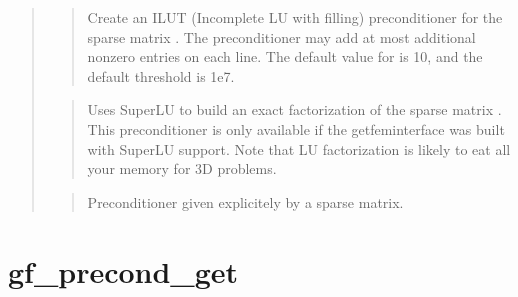 \documentclass[a4paper,11pt,english]{sphinxmanual}
\begin{document}
\begin{quote}
\sphinxAtStartPar
{}
\begin{quote}

\sphinxAtStartPar
Create an ILUT (Incomplete LU with filling) preconditioner for the
sparse matrix . The preconditioner may add at most 
additional non\sphinxhyphen{}zero entries on each line. The default value for
 is 10, and the default threshold is 1e\sphinxhyphen{}7.
\end{quote}

\sphinxAtStartPar
{}
\begin{quote}

\sphinxAtStartPar
Uses SuperLU to build an exact factorization of the sparse matrix .
This preconditioner is only available if the getfem\sphinxhyphen{}interface was
built with SuperLU support. Note that LU factorization is likely to
eat all your memory for 3D problems.
\end{quote}

\sphinxAtStartPar
{}
\begin{quote}

\sphinxAtStartPar
Preconditioner given explicitely by a sparse matrix.
\end{quote}
\end{quote}


\section{gf\_precond\_get}
\label{\detokenize{matlab_octave/cmdref_gf_precond_get:gf-precond-get}}\label{\detokenize{matlab_octave/cmdref_gf_precond_get::doc}}
\sphinxAtStartPar
{}
\end{document}
